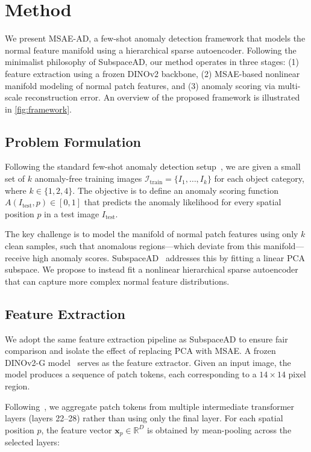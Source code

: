 \section{Method}
\label{sec:method}

We present MSAE-AD, a few-shot anomaly detection framework that models the normal feature manifold using a hierarchical sparse autoencoder.
Following the minimalist philosophy of SubspaceAD, our method operates in three stages: (1) feature extraction using a frozen DINOv2 backbone, (2) MSAE-based nonlinear manifold modeling of normal patch features, and (3) anomaly scoring via multi-scale reconstruction error.
An overview of the proposed framework is illustrated in \cref{fig:framework}.

\subsection{Problem Formulation}

Following the standard few-shot anomaly detection setup~\cite{Lendering2025SubspaceAD,Huang2022WinCLIP}, we are given a small set of $k$ anomaly-free training images $\mathcal{I}_{\text{train}} = \{I_1, \ldots, I_k\}$ for each object category, where $k \in \{1, 2, 4\}$.
The objective is to define an anomaly scoring function $A(I_{\text{test}}, p) \in [0, 1]$ that predicts the anomaly likelihood for every spatial position $p$ in a test image $I_{\text{test}}$.

The key challenge is to model the manifold of normal patch features using only $k$ clean samples, such that anomalous regions---which deviate from this manifold---receive high anomaly scores.
SubspaceAD~\cite{Lendering2025SubspaceAD} addresses this by fitting a linear PCA subspace.
We propose to instead fit a nonlinear hierarchical sparse autoencoder that can capture more complex normal feature distributions.

\subsection{Feature Extraction}

We adopt the same feature extraction pipeline as SubspaceAD to ensure fair comparison and isolate the effect of replacing PCA with MSAE.
A frozen DINOv2-G model~\cite{Oquab2023DINOv2} serves as the feature extractor.
Given an input image, the model produces a sequence of patch tokens, each corresponding to a $14 \times 14$ pixel region.

Following~\cite{Lendering2025SubspaceAD}, we aggregate patch tokens from multiple intermediate transformer layers (layers 22--28) rather than using only the final layer.
For each spatial position $p$, the feature vector $\mathbf{x}_p \in \mathbb{R}^D$ is obtained by mean-pooling across the selected layers:

